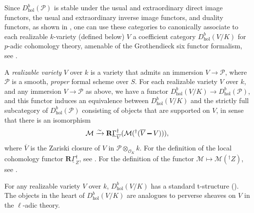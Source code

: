 \documentclass{amsart}
\numberwithin{equation}{section}
\theoremstyle{plain}
\theoremstyle{definition}
\renewcommand{\mathbb}{\mathbf}
\renewcommand{\setminus}{\mathbin{\rule[0.2em]{0.67em}{0.12em}}}%
\begin{document}
Since \(D^{b}_{\mathrm{hol}}(\mathcal{P})\) is stable under the usual
and extraordinary direct image functors, the usual and extraordinary
inverse image functors, and duality functors, as shown in
\cite{caro:overholonomic-arithmetic-d-modules}, one can use these
categories to canonically associate to each realizable \(k\)-variety
(defined below) \(V\) a coefficient category
\(D^{b}_{\mathrm{hol}}(V/K)\) for \(p\)-adic cohomology theory,
amenable of the Grothendieck six functor formalism, see
\cite{caro:6op,abe-caro:theory-of-weights-in-p-adic-cohomology}.

\medskip%
A \emph{realizable variety} \(V\) over \(k\) is a variety that admits
an immersion \(V \to \mathcal{P}\), where \(\mathcal{P}\) is a smooth,
\emph{proper} formal scheme over \(S\).  For each realizable variety
\(V\) over \(k\), and any immersion \(V \to \mathcal{P}\) as above, we
have a functor
\(D^{b}_{\mathrm{hol}}(V/K) \to D^{b}_{\mathrm{hol}}(\mathcal{P})\),
and this functor induces an equivalence between
\(D^{b}_{\mathrm{hol}}(V/K)\) and the strictly full subcategory of
\(D^{b}_{\mathrm{hol}}(\mathcal{P})\) consisting of objects that are
supported on \(V\), in sense that there is an isomorphism
\begin{equation*}
\mathcal{M} \xrightarrow{\sim} \mathbb{R}\underline{\Gamma}_{\overline{V}}^{\dagger} (\mathcal{M} ({}^{\dagger}(\overline{V}\setminus V))),
\end{equation*}
where \(\overline{V}\) is the Zariski closure of \(V\) in \(\mathcal{P} \otimes_{\mathcal{O}_{K}}k\).
For the definition of the local cohomology functor
\(\mathbb{R}\underline{\Gamma}^{\dagger}_{Z}\), see
\cite[2.1.3 (divsior case) and Définition~2.2.6 (general case)]{caro:overcoherent-arithmetic-d-modules}.
For the definition of the functor
\(\mathcal{M} \mapsto \mathcal{M}({}^{\dagger}Z)\), see
\cite[Définition~2.2.6]{caro:overcoherent-arithmetic-d-modules}.

\medskip%
For any realizable variety \(V\) over \(k\),
\(D^{b}_{\mathrm{hol}}(V/K)\) has a standard t-structure
(\cite[\S1.2]{abe-caro:theory-of-weights-in-p-adic-cohomology}).
The objects in the heart of \(D^{b}_{\mathrm{hol}}(V/K)\) are analogues to
perverse sheaves on \(V\) in the \(\ell\)-adic theory.
\end{document}
